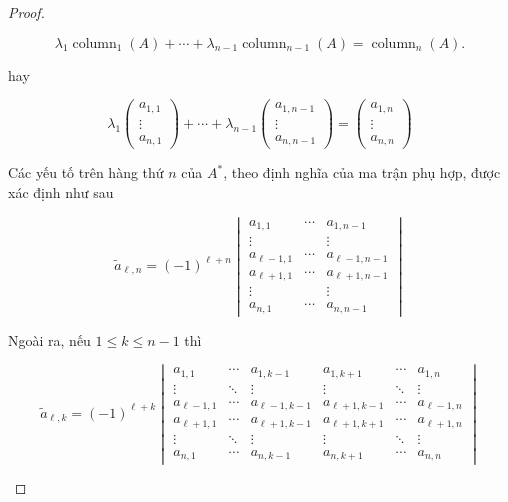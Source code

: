 \documentclass[class=nhvh-linear-algebra,crop=false]{standalone}
\begin{document}
\begin{proof}
\begin{enumerate}[label = \textbf{Trường hợp \arabic*.},itemindent=2cm]
		      \[ \lambda_{1}\operatorname{column}_{1}(A) + \cdots + \lambda_{n-1}\operatorname{column}_{n-1}(A) = \operatorname{column}_{n}(A). \]

		      hay

		      \[\lambda_{1}\begin{pmatrix}a_{1,1}\\ \vdots \\ a_{n,1} \end{pmatrix} + \cdots + \lambda_{n-1}\begin{pmatrix}a_{1,n-1}\\ \vdots \\ a_{n,n-1} \end{pmatrix} = \begin{pmatrix}a_{1,n}\\ \vdots \\ a_{n,n} \end{pmatrix}\]

		      Các yếu tố trên hàng thứ $n$ của $A^{*}$, theo định nghĩa của ma trận phụ hợp, được xác định như sau

		      \[\tilde{a}_{\ell, n} = {(-1)}^{\ell + n} \begin{vmatrix} a_{1,1}      & \cdots & a_{1,n-1}      \\ \vdots &  & \vdots \\ a_{\ell-1,1} & \cdots & a_{\ell-1,n-1} \\
                a_{\ell+1,1} & \cdots & a_{\ell+1,n-1} \\ \vdots & & \vdots \\ a_{n,1} & \cdots & a_{n,n-1}\end{vmatrix}\]

		      Ngoài ra, nếu $1\leq k\leq n-1$ thì

		      \[\tilde{a}_{\ell, k} = {(-1)}^{\ell + k} \begin{vmatrix} a_{1,1} & \cdots & a_{1,k-1} & a_{1,k+1} & \cdots & a_{1,n} \\ \vdots & \ddots & \vdots & \vdots & \ddots & \vdots \\ a_{\ell - 1,1} & \cdots & a_{\ell-1,k-1} & a_{\ell+1,k-1} & \cdots & a_{\ell-1,n} \\ a_{\ell+1,1} & \cdots & a_{\ell+1,k-1} & a_{\ell+1,k+1} & \cdots & a_{\ell+1,n} \\ \vdots & \ddots & \vdots & \vdots & \ddots & \vdots \\ a_{n,1} & \cdots & a_{n,k-1} & a_{n,k+1} & \cdots & a_{n,n} \end{vmatrix}\]


\end{enumerate}
\end{proof}
\end{document}
